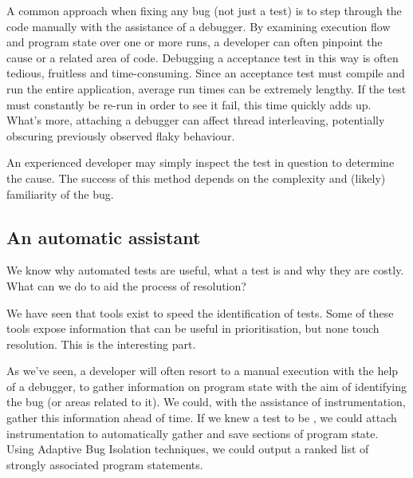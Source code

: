 A common approach when fixing any bug (not just a \flaky test) is to step
through the code manually with the assistance of a debugger. By examining
execution flow and program state over one or more runs, a developer can often
pinpoint the cause or a related area of code. Debugging a \flaky acceptance test
in this way is often tedious, fruitless and time-consuming. Since an acceptance
test must compile and run the entire application, average run times can be
extremely lengthy. If the test must constantly be re-run in order to see it
fail, this time quickly adds up. What's more, attaching a debugger can affect
thread interleaving, potentially obscuring previously observed flaky behaviour.

An experienced developer may simply inspect the test in question to determine
the cause. The success of this method depends on the complexity and (likely)
familiarity of the bug.


\subsection{An automatic assistant}

We know why automated tests are useful, what a \flaky test is and why they are
costly. What can we do to aid the process of resolution?

We have seen that tools exist to speed the identification of \flaky tests. Some
of these tools expose information that can be useful in prioritisation, but none
touch resolution. This is the interesting part.

As we've seen, a developer will often resort to a manual execution with the help
of a debugger, to gather information on program state with the aim of
identifying the bug (or areas related to it). We could, with the assistance of
instrumentation, gather this information ahead of time. If we knew a test to be
\flaky, we could attach instrumentation to automatically gather and save
sections of program state. Using Adaptive Bug Isolation techniques, we could
output a ranked list of strongly associated program statements.
